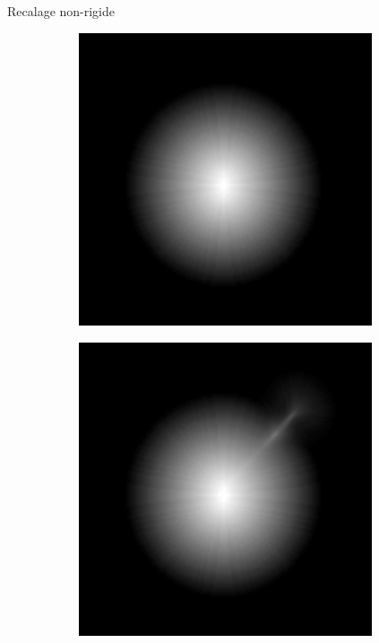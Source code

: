 \documentclass[10pt]{beamer}
\begin{document}
\begin{frame}{Recalage non-rigide}
\begin{figure}[ht]
\begin{subfigure}[t]{0.2\textwidth}
    \caption{}
    \label{subfig:registration_target}
  \end{subfigure}%
  \begin{subfigure}[t]{0.2\textwidth}
    \centering
    \includegraphics[width=0.95\textwidth]{fig/registration_reference_dt}
    \caption{}
    \label{subfig:registration_dt_reference}
  \end{subfigure}%
  \begin{subfigure}[t]{0.2\textwidth}
    \centering
    \includegraphics[width=0.95\textwidth]{fig/registration_target_dt_interpol.png}

\end{subfigure}
\end{figure}
\end{frame}
\end{document}
